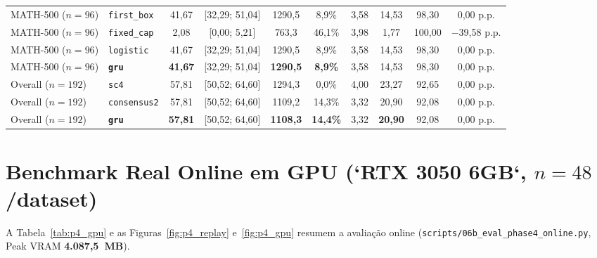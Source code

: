 \documentclass[11pt,a4paper]{article}
\begin{document}
\begin{table}[H]
{\begin{tabular}{@{}llcccccccc@{}}
MATH-500 ($n=96$) & \texttt{first\_box} & 41,67 & [32,29; 51,04] & 1290,5 & 8,9\% & 3,58 & 14,53 & 98,30 & 0,00 p.p. \\
MATH-500 ($n=96$) & \texttt{fixed\_cap} & 2,08 & [0,00; 5,21] & 763,3 & 46,1\% & 3,98 & 1,77 & 100,00 & $-$39,58 p.p. \\
MATH-500 ($n=96$) & \texttt{logistic} & 41,67 & [32,29; 51,04] & 1290,5 & 8,9\% & 3,58 & 14,53 & 98,30 & 0,00 p.p. \\
MATH-500 ($n=96$) & \textbf{\texttt{gru}} & \textbf{41,67} & [32,29; 51,04] & \textbf{1290,5} & \textbf{8,9\%} & 3,58 & 14,53 & 98,30 & 0,00 p.p. \\
\midrule
Overall ($n=192$) & \texttt{sc4} & 57,81 & [50,52; 64,60] & 1294,3 & 0,0\% & 4,00 & 23,27 & 92,65 & 0,00 p.p. \\
Overall ($n=192$) & \texttt{consensus2} & 57,81 & [50,52; 64,60] & 1109,2 & 14,3\% & 3,32 & 20,90 & 92,08 & 0,00 p.p. \\
Overall ($n=192$) & \textbf{\texttt{gru}} & \textbf{57,81} & [50,52; 64,60] & \textbf{1108,3} & \textbf{14,4\%} & 3,32 & \textbf{20,90} & 92,08 & 0,00 p.p. \\
\bottomrule
\end{tabular}%
}
\end{table}

\section{Benchmark Real Online em GPU (`RTX 3050 6GB`, $n=48$/dataset)}
A Tabela~\ref{tab:p4_gpu} e as Figuras~\ref{fig:p4_replay} e~\ref{fig:p4_gpu} resumem a avaliação online (\texttt{scripts/06b\_eval\_phase4\_online.py}, Peak VRAM \textbf{4.087,5~MB}).
\end{document}
